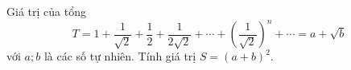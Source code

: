 \begin{ex}
Giá trị của tổng \[T=1+\dfrac1{\sqrt2}+\dfrac12+\dfrac1{2\sqrt2}+\cdots+\left(\dfrac1{\sqrt2}\right)^n+\cdots=a+\sqrt b\] với $a;b$ là các số tự nhiên. Tính giá trị $S=(a+b)^2$.
\end{ex}
